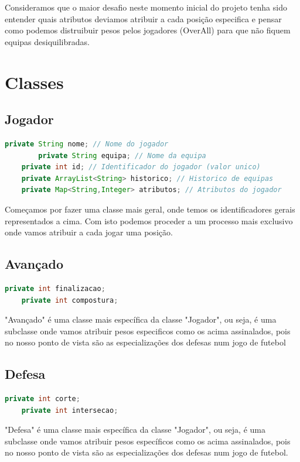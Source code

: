 \documentclass[a4paper]{report}
\begin{document}
	Consideramos que o maior desafio neste momento inicial do projeto tenha sido entender quais atributos deviamos atribuir a cada posição especifica e pensar como podemos distruibuir pesos pelos jogadores (OverAll) para que não fiquem equipas desiquilibradas.
	
	\chapter{Classes}
	
	\section{Jogador}
	\begin{lstlisting}[language=java]
	private String nome; // Nome do jogador
        private String equipa; // Nome da equipa
    private int id; // Identificador do jogador (valor unico)
    private ArrayList<String> historico; // Historico de equipas
    private Map<String,Integer> atributos; // Atributos do jogador
	\end{lstlisting}
	
	Começamos por fazer uma classe mais geral, onde temos os identificadores gerais representados a cima. Com isto podemos proceder a um processo mais exclusivo onde vamos atribuir a cada jogar uma posição.
	
	\section{Avançado}
	\begin{lstlisting}[language=Java]
	private int finalizacao;
    private int compostura;
	\end{lstlisting}
	
	"Avançado" é uma classe mais específica da classe "Jogador", ou seja, é uma subclasse onde vamos atribuir pesos especificos como os acima assinalados, pois no nosso ponto de vista são as especializações dos defesas num jogo de futebol
	
	
	
	\section{Defesa}
	\begin{lstlisting}[language=Java]
	private int corte;
    private int intersecao;
	\end{lstlisting}
	
	"Defesa" é uma classe mais específica da classe "Jogador", ou seja, é uma subclasse onde vamos atribuir pesos específicos como os acima assinalados, pois no nosso ponto de vista são as especializações dos defesas num jogo de futebol.
	
\end{document}
